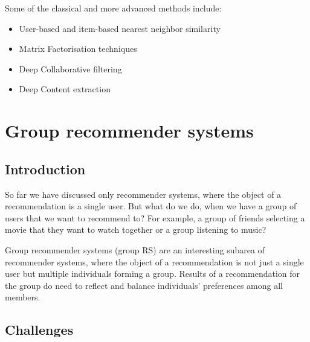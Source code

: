 Some of the classical and more advanced methods include:
\begin{itemize}
    \item User-based and item-based nearest neighbor similarity \cite{hill1995recommending}\cite{shardanand1995social}\cite{balabanovic1997fab}
    \item Matrix Factorisation techniques\cite{koren2009matrix}
    \item Deep Collaborative filtering \cite{he2017neural}\cite{YOUTUBE_deeprec-covington2016}\cite{DeepLearningBasedRecommenderSystem_zhang2019deep}
    \item Deep Content extraction\cite{DeepLearningBasedRecommenderSystem_zhang2019deep}
\end{itemize}




\section{Group recommender systems} \label{section01.1}
\subsection*{Introduction}
So far we have discussed only recommender systems, where the object of a recommendation is a single user. But what do we do, when we have a group of users that we want to recommend to? For example, a group of friends selecting a movie that they want to watch together or a group listening to music? %

Group recommender systems (group RS) are an interesting subarea of recommender systems, where the object of a recommendation is not just a single user but multiple individuals forming a group. Results of a recommendation for the group do need to reflect and balance individuals' preferences among all members.

\subsection*{Challenges}


